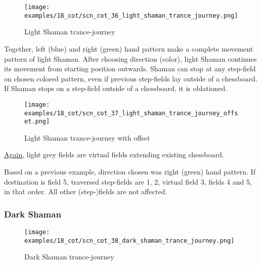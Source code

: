 \vspace*{-1.4\baselineskip}
\noindent
\begin{figure}[!h]
\texttt{[image: examples/18\_cot/scn\_cot\_36\_light\_shaman\_trance\_journey.png]}
\caption{Light Shaman trance-journey}
\label{fig:scn_cot_36_light_shaman_trance_journey}
\end{figure}

Together, left (blue) and right (green) hand pattern make a complete movement
pattern of light Shaman. After choosing direction (color), light Shaman
continues its movement from starting position outwards. Shaman can stop at
any step-field on chosen colored pattern, even if previous step-fields lay
outside of a chessboard. If Shaman stops on a step-field outside of a
chessboard, it is oblationed.

\clearpage %

\noindent
\begin{figure}[!h]
\texttt{[image: examples/18\_cot/scn\_cot\_37\_light\_shaman\_trance\_journey\_offset.png]}
\caption{Light Shaman trance-journey with offset}
\label{fig:scn_cot_37_light_shaman_trance_journey_offset}
\end{figure}

\hyperref[fig:scn_hd_06_centaur_off_board]{Again},
light grey fields are virtual fields extending existing chessboard.

Based on a previous example, direction chosen was right (green) hand pattern.
If destination is field 5, traversed step-fields are 1, 2, virtual field 3,
fields 4 and 5, in that order. All other (step-)fields are not affected.

\clearpage %

\subsubsection*{Dark Shaman}
\label{sec:Conquest of Tlalocan/Trance-journey/Movement/Dark Shaman}

\vspace*{-1.5\baselineskip}
\noindent
\begin{figure}[!h]
\texttt{[image: examples/18\_cot/scn\_cot\_38\_dark\_shaman\_trance\_journey.png]}
\vspace*{-1.4\baselineskip}
\caption{Dark Shaman trance-journey}
\label{fig:scn_cot_38_dark_shaman_trance_journey}
\end{figure}

